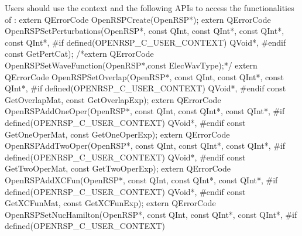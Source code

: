 Users should use the \LibName context and the following APIs to access the
functionalities of \LibName:
\nwenddocs{}\endmoddef
extern QErrorCode OpenRSPCreate(OpenRSP*);
extern QErrorCode OpenRSPSetPerturbations(OpenRSP*,
                                          const QInt,
                                          const QInt*,
                                          const QInt*,
                                          const QInt*,
#if defined(OPENRSP_C_USER_CONTEXT)
                                          QVoid*,
#endif
                                          const GetPertCat);
/*extern QErrorCode OpenRSPSetWaveFunction(OpenRSP*,const ElecWavType);*/
extern QErrorCode OpenRSPSetOverlap(OpenRSP*,
                                    const QInt,
                                    const QInt*,
                                    const QInt*,
#if defined(OPENRSP_C_USER_CONTEXT)
                                    QVoid*,
#endif
                                    const GetOverlapMat,
                                    const GetOverlapExp);
extern QErrorCode OpenRSPAddOneOper(OpenRSP*,
                                    const QInt,
                                    const QInt*,
                                    const QInt*,
#if defined(OPENRSP_C_USER_CONTEXT)
                                    QVoid*,
#endif
                                    const GetOneOperMat,
                                    const GetOneOperExp);
extern QErrorCode OpenRSPAddTwoOper(OpenRSP*,
                                    const QInt,
                                    const QInt*,
                                    const QInt*,
#if defined(OPENRSP_C_USER_CONTEXT)
                                    QVoid*,
#endif
                                    const GetTwoOperMat,
                                    const GetTwoOperExp);
extern QErrorCode OpenRSPAddXCFun(OpenRSP*,
                                  const QInt,
                                  const QInt*,
                                  const QInt*,
#if defined(OPENRSP_C_USER_CONTEXT)
                                  QVoid*,
#endif
                                  const GetXCFunMat,
                                  const GetXCFunExp);
extern QErrorCode OpenRSPSetNucHamilton(OpenRSP*,
                                        const QInt,
                                        const QInt*,
                                        const QInt*,
#if defined(OPENRSP_C_USER_CONTEXT)
